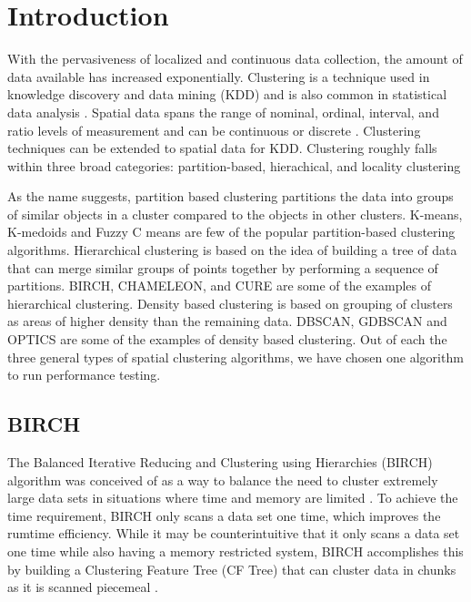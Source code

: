 \documentclass[conference, 10pt]{IEEEtran}
\begin{document}
\section{Introduction}
With the pervasiveness of localized and continuous data collection, the amount of data available has increased exponentially. Clustering is a technique used in knowledge discovery and data mining (KDD) and is also common in statistical data analysis \cite{survey}. Spatial data spans the range of nominal, ordinal, interval, and ratio levels of measurement and can be continuous or discrete \cite{spat}. Clustering techniques can be extended to spatial data for KDD. Clustering roughly falls within three broad categories: partition-based, hierachical, and locality clustering \cite{spatial}

 As the name suggests, partition based clustering partitions the data into groups of similar objects in a cluster compared to the objects in other clusters.  K-means, K-medoids and Fuzzy C means are few of the popular partition-based clustering algorithms.  Hierarchical clustering is based on the idea of building a tree of data that can merge similar groups of points together by performing a sequence of partitions. BIRCH, CHAMELEON, and CURE are some of the examples of hierarchical clustering.  Density based clustering is based on grouping of clusters as areas of higher density than the remaining data. DBSCAN, GDBSCAN and OPTICS are some of the examples of density based clustering. Out of each the three general types of spatial clustering algorithms, we have chosen one algorithm to run performance testing.

\subsection{BIRCH}

The Balanced Iterative Reducing and Clustering using Hierarchies (BIRCH) algorithm was conceived of as a way to balance the need to cluster extremely large data sets in situations where time and memory are limited \cite{birch}. To achieve the time requirement, BIRCH only scans a data set one time, which improves the rumtime efficiency. While it may be counterintuitive that it only scans a data set one time while also having a memory restricted system, BIRCH accomplishes this by building a Clustering Feature Tree (CF Tree) that can cluster data in chunks as it is scanned piecemeal \cite{birch}.
\end{document}
